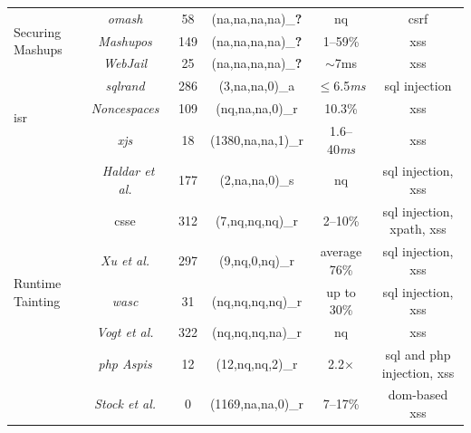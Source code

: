 \documentclass[conference]{IEEEtran}
\newcommand{\tick}{\ding{52}}
\newcommand{\xmark}{\ding{56}}
\begin{document}
\begin{landscape}
\begin{table}
\begin{threeparttable}
\begin{small}
{\begin{tabular}{l|c|c|cc|c}
  \hline
  \hline 
  \multirow{3}{*}{Securing Mashups}
  &   {\it {\sc om}ash}~\cite{CHC08} & 58 & ({\sc na},{\sc na},{\sc na},{\sc na})\_{\bf ?} & {\sc nq} & {\sc csrf} \\
  &   {\it Mashup{\sc os}}~\cite{WFHJ07} & 149 & ({\sc na},{\sc na},{\sc na},{\sc na})\_{\bf ?} & 1--59\% & {\sc xss} \\
  &   {\it WebJail}~\cite{VDDPJ11} & 25 & ({\sc na},{\sc na},{\sc na},{\sc na})\_{\bf ?} & $\sim$7ms & {\sc xss} \\
  \hline
  \hline
  \multirow{3}{*}{{\sc isr}}
  &   {\it {\sc sql}rand}~\cite{BK04} & 286 & (3,{\sc na},{\sc na},0)\_a & $\le$6.5{\it ms} & {\sc sql} injection \\
  &   {\it Noncespaces}~\cite{GC09} & 109 & ({\sc nq},{\sc na},{\sc na},0)\_r &  10.3\% & {\sc xss} \\ 
  &   {\it x{\sc js}}~\cite{APKLM10} & 18 & (1380,{\sc na},{\sc na},1)\_r & 1.6--40{\it ms} & {\sc xss} \\
  \hline
  \hline
	\multirow{8}{*}{Runtime Tainting}
  &   {\it Haldar et al.}~\cite{HCF05} & 177 & (2,{\sc na},{\sc na},0)\_s & {\sc nq} & {\sc sql} injection, {\sc xss} \\ 
	&  	{\sc csse}~\cite{PB05} & 312 & (7,{\sc nq},{\sc nq},{\sc nq})\_r & 2--10\% & {\sc sql} injection, {\sc xp}ath, {\sc xss} \\
	&  	{\it Xu et al.}~\cite{XBS06} & 297 & (9,{\sc nq},0,{\sc nq})\_r & average 76\% & {\sc sql} injection, {\sc xss} \\ 
  &  	{\it {\sc wasc}}~\cite{NLC07} & 31 & ({\sc nq},{\sc nq},{\sc nq},{\sc nq})\_r & up to 30\% & {\sc sql} injection, {\sc xss} \\
	&  	{\it Vogt et al.}~\cite{VFJKKV07} & 322 & ({\sc nq},{\sc nq},{\sc nq},{\sc na})\_r & {\sc nq} & {\sc xss} \\
	&  	{\it {\sc php} Aspis}~\cite{PMP11} & 12 & (12,{\sc nq},{\sc nq},2)\_r & 2.2$\times$ & {\sc sql} and {\sc php} injection, {\sc xss} \\
	& 	{\it Stock et al.}~\cite{SLMS14} & 0 & (1169,{\sc na},{\sc na},0)\_r & 7--17\% & {\sc dom}-based {\sc xss} \\

\end{tabular}}
\end{small}
\end{threeparttable}
\end{table}
\end{landscape}
\end{document}
